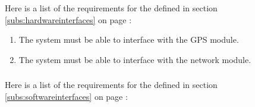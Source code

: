 
\subsubsection{} %
Here is a list of the requirements for the  defined in section \ref{subs:hardwareinterfaces} on page \pageref{subs:hardwareinterfaces}:

\begin{enumerate} [resume*]

\item The system must be able to interface with the GPS module.

\item The system must be able to interface with the network module.



\end{enumerate} 


\subsubsection{} %
Here is a list of the requirements for the  defined in section \ref{subs:softwareinterfaces} on page \pageref{subs:softwareinterfaces}:




\subsubsection{} %


